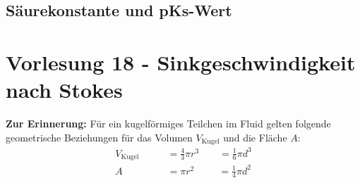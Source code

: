 \documentclass[a4paper,10pt,twoside]{article}
\begin{document}
\subsection{Säurekonstante und pKs-Wert}


\pagebreak
\enlargethispage{\baselineskip}
\section*{Vorlesung 18 - Sinkgeschwindigkeit nach Stokes}\addtocounter{section}{1}

\textbf{Zur Erinnerung:} Für ein kugelförmiges Teilchen im Fluid gelten folgende geometrische Beziehungen für das Volumen $V_{\text{Kugel}}$ und die Fläche $A$:
\begin{align*}
    V_{\text{Kugel}} \qquad &= \frac{4}{3}\pi r^3 \qquad = \frac{1}{6}\pi d^3 \\
    A \qquad &= \pi r^2 \qquad ~~  = \frac{1}{4}\pi d^2
\end{align*}
\end{document}
